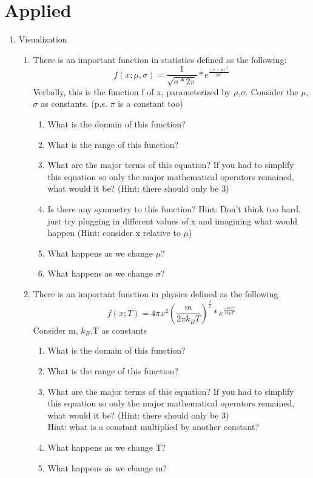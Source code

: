 \documentclass{article}
\begin{document}
\section{Applied}
\begin{enumerate}

    \item Visualization\\
    \begin{enumerate}
        \item There is an important function in statistics defined as the following:
            \[ f(x;\mu,\sigma) = \frac{1}{\sqrt{\sigma * 2\pi}}*e^{\frac{(x-\mu)^2}{2\sigma^2}}  \]
            Verbally, this is the function f of x, parameterized by $\mu$,$\sigma$. Consider the  $\mu$,$\sigma$ as constants. (p.s. $\pi$ is a constant too)
            \begin{enumerate}
                \item What is the domain of this function?
                \item What is the range of this function?
                \item What are the major terms of this equation? If you had to simplify this equation so only the major mathematical operators remained, what would it be? (Hint: there should only be 3)
                \item Is there any symmetry to this function? Hint: Don't think too hard, just try plugging in different values of x and imagining what would happen (Hint: consider x relative to $\mu$)
                \item What happens as we change $\mu$?
                \item What happens as we change $\sigma$?
            \end{enumerate}
        \item There is an important function in physics defined as the following
         \[ f(x;T) = 4\pi x^2  (\frac{m}{2\pi k_B T})^{\frac{3}{2}}*e^{\frac{-m x^2}{2k_B T}} \]
         Consider m, $k_B$,T as constants
            \begin{enumerate}
                \item What is the domain of this function?
                \item What is the range of this function?
                \item What are the major terms of this equation? If you had to simplify this equation so only the major mathematical operators remained, what would it be? (Hint: there should only be 3)\\
                Hint: what is a constant multiplied by another constant?
                \item What happens as we change T?
                \item What happens as we change m?
            \end{enumerate}
    \end{enumerate}
        

\end{enumerate}
\end{document}
